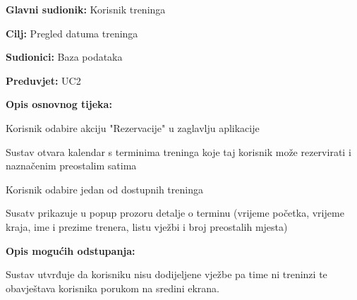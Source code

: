 					\noindent {}		
						\begin{packed_item}
						
						
						\item \textbf{Glavni sudionik: }Korisnik treninga
						\item  \textbf{Cilj:} Pregled datuma treninga
						\item  \textbf{Sudionici:} Baza podataka
						\item  \textbf{Preduvjet:} UC2
						\item  \textbf{Opis osnovnog tijeka:}
						
						\item[] \begin{packed_enum}
							
							\item Korisnik odabire akciju "Rezervacije" u zaglavlju aplikacije 
							\item Sustav otvara kalendar s terminima treninga koje taj korisnik može rezervirati i naznačenim preostalim satima
							\item Korisnik odabire jedan od dostupnih treninga 
							\item Susatv prikazuje u popup prozoru detalje o terminu (vrijeme početka, vrijeme kraja, ime i prezime trenera, listu vježbi i broj preostalih mjesta)

							
						\end{packed_enum}
						
						\item  \textbf{Opis mogućih odstupanja:}
						
						\begin{packed_enum}
							
							\item[3.a] Sustav utvrđuje da korisniku nisu dodijeljene vježbe pa time ni treninzi te obavještava korisnika porukom na sredini ekrana.
							
						\end{packed_enum}
						
					\end{packed_item}
				
